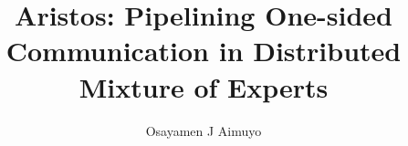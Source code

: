 \documentclass{sig-alternate-per}
\begin{document}
    \title{Aristos: Pipelining One-sided Communication in Distributed Mixture of Experts}


    \author{
        \alignauthor
        Osayamen J Aimuyo\\
        \\
    }

    \newcommand{\ata}{\emph{All-to-All}}

    \maketitle
    

    

    

    

    
    \clearpage
    
    
\end{document}
